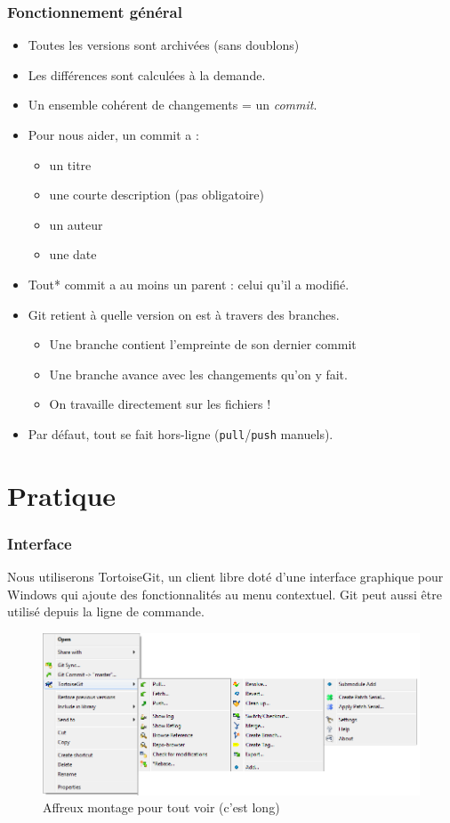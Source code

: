 \documentclass[compress]{beamer}
\begin{document}
\begin{frame}
	\frametitle{Fonctionnement général}
	\begin{itemize}
		\item Toutes les versions sont archivées (sans doublons) \pause
		\item Les différences sont calculées à la demande. \pause
		\item Un ensemble cohérent de changements = un \emph{commit}. \pause
		\item Pour nous aider, un commit a :
			\begin{itemize}
				\item un titre
				\item une courte description (pas obligatoire) \pause
				\item un auteur
				\item une date \pause
			\end{itemize}
		\item Tout* commit a au moins un parent : celui qu'il a modifié. \pause
		\item Git retient à quelle version on est à travers des branches.
			\begin{itemize}
				\item Une branche contient l'empreinte de son dernier commit
					\pause
				\item Une branche avance avec les changements qu'on y fait.
					\pause
				\item On travaille directement sur les fichiers !
					\pause
			\end{itemize}
		\item Par défaut, tout se fait hors-ligne
			(\texttt{pull}/\texttt{push} manuels).
	\end{itemize}
\end{frame}


\section{Pratique}
\begin{frame}
	\frametitle{Interface}\label{s:ctx}
	Nous utiliserons TortoiseGit, un client libre
	doté d'une interface graphique pour Windows
	qui ajoute des fonctionnalités au menu contextuel.
	Git peut aussi être utilisé depuis la ligne de commande.

	\begin{figure}[h]
		\centering
		\includegraphics[width=\textwidth]{tg-ctx-wide.png}
		\caption{Affreux montage pour tout voir (c'est long)}
	\end{figure}
\end{frame}
\end{document}
